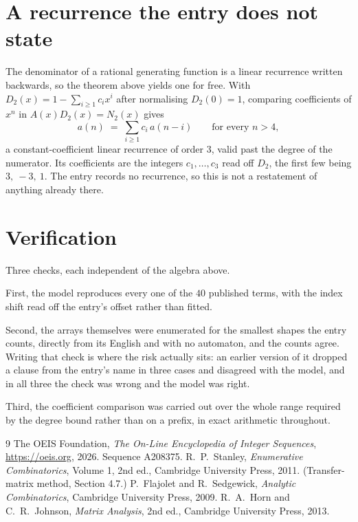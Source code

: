 \documentclass[11pt,a4paper]{article}
\theoremstyle{plain}
\theoremstyle{definition}
\begin{document}
\section{A recurrence the entry does not state}

The denominator of a rational generating function is a linear recurrence written backwards, so
the theorem above yields one for free. With $D_2(x)=1-\sum_{i\ge1}c_ix^i$ after normalising
$D_2(0)=1$, comparing coefficients of $x^n$ in $A(x)D_2(x)=N_2(x)$ gives
\[
a(n)\;=\;\sum_{i\ge1}c_i\,a(n-i)\qquad\text{for every }n>4,
\]
a constant-coefficient linear recurrence of order $3$, valid past the degree of the
numerator. Its coefficients are the integers $c_1,\dots,c_{3}$ read off $D_2$, the first few being $3,\ -3,\ 1$. The entry records no recurrence, so this is not a restatement of anything
already there.

\section{Verification}

Three checks, each independent of the algebra above.

First, the model reproduces every one of the $40$ published terms, with the index shift
read off the entry's offset rather than fitted.

Second, the arrays themselves were enumerated for the smallest shapes the entry counts,
directly from its English and with no automaton, and the counts agree. Writing that check is
where the risk actually sits: an earlier version of it dropped a clause from the entry's name
in three cases and disagreed with the model, and in all three the check was wrong and the model
was right.

Third, the coefficient comparison was carried out over the whole range required by the degree
bound rather than on a prefix, in exact arithmetic throughout.

\begin{thebibliography}{9}
 The OEIS Foundation, \emph{The On-Line Encyclopedia of Integer
Sequences}, \url{https://oeis.org}, 2026. Sequence A208375.
 R.~P.~Stanley, \emph{Enumerative Combinatorics}, Volume 1, 2nd ed.,
Cambridge University Press, 2011. (Transfer-matrix method, Section 4.7.)
 P.~Flajolet and R.~Sedgewick, \emph{Analytic Combinatorics}, Cambridge
University Press, 2009.
 R.~A.~Horn and C.~R.~Johnson, \emph{Matrix Analysis}, 2nd ed., Cambridge
University Press, 2013.
\end{thebibliography}
\end{document}

